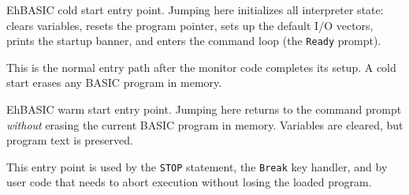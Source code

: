 \par\vspace{1.2em}%
\noindent
{}%
\par\nopagebreak\vspace{0.3em}%
\label{addr:C000-cold}%
%

EhBASIC cold start entry point.  Jumping here initializes all interpreter
state: clears variables, resets the program pointer, sets up the default
I/O vectors, prints the startup banner, and enters the command loop (the
\texttt{Ready} prompt).

This is the normal entry path after the monitor code completes its setup.
A cold start erases any BASIC program in memory.


\par\vspace{1.2em}%
\noindent
{}%
\par\nopagebreak\vspace{0.3em}%
\label{addr:C003}%
%

EhBASIC warm start entry point.  Jumping here returns to the command
prompt \emph{without} erasing the current BASIC program in memory.
Variables are cleared, but program text is preserved.

This entry point is used by the \texttt{STOP} statement, the
\texttt{Break} key handler, and by user code that needs to abort execution
without losing the loaded program.


